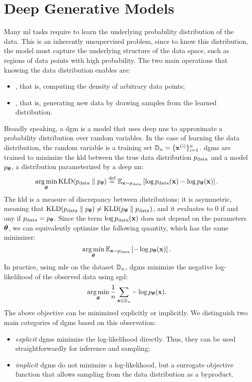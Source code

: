 \section{Deep Generative Models}
Many \gls{ml} tasks require to learn the underlying probability distribution of the data. This is an inherently unsupervised problem, since to know this distribution, the model must capture the underlying structure of the data space, such as regions of data points with high probability. The two main operations that knowing the data distribution enables are:
\begin{itemize}
    \item {}, that is, computing the density of arbitrary data points;
    \item {}, that is, generating new data by drawing samples from the learned distribution.
\end{itemize}
Broadly speaking, a \gls{dgm} \citep{goodfellow2016dl} is a model that uses deep \glspl{nn} to approximate a probability distribution over random variables. In the case of learning the data distribution, the random variable is a training set $\Data_n = \Set{\VPattern{x}{i}}_{i=1}^n$. \glspl{dgm} are trained to minimize the \gls{kld} between the true data distribution $p_{\mathrm{data}}$ and a model $p_{\boldsymbol{\theta}}$, a distribution parameterized by a deep \gls{nn}:
$$\argmin_{\Param} \Fun{KLD}(\PData \;\Vert\; p_{\Param}) \defeq \Expect_{\Vector{x} \sim \PData}\Brack{\log \PData(\Vector{x}) -\log p_{\Param}(\Vector{x})}.$$
The \gls{kld} is a measure of discrepancy between distributions; it is asymmetric, meaning that $\mathrm{KLD}(p_{\mathrm{data}} \;\Vert\; p_{\boldsymbol{\theta}}) \neq \mathrm{KLD}(p_{\boldsymbol{\theta}} \;\Vert\; p_{\mathrm{data}})$, and it evaluates to 0 if and ony if $p_{\mathrm{data}} = p_{\boldsymbol{\theta}}$. Since the term $\log \PData(\Vector{x})$ does not depend on the parameters $\boldsymbol{\theta}$, we can equivalently optimize the following quantity, which has the same minimizer:
$$\argmin_{\Param} \Expect_{\Vector{x} \sim \PData}\Brack{-\log p_{\Param}(\Vector{x})}.$$
In practice, using \gls{mle} on the dataset $\mathbb{D}_n$, \glspl{dgm} minimize the negative log-likelihood of the observed data using \gls{sgd}:
$$\argmin_{\Param} \frac{1}{n} \sum_{\Vector{x} \in \Data_n}-\log p_{\Param}(\Vector{x}).$$
The above objective can be minimized explicitly or implicitly. We distinguish two main categories of \glspl{dgm} based on this observation:
\begin{itemize}
    \item \emph{explicit} \glspl{dgm} minimize the log-likelihood directly. Thus, they can be used straightforwardly for inference and sampling;
    \item \emph{implicit} \glspl{dgm} do not minimize a log-likelihood, but a surrogate objective function that allows sampling from the data distribution as a byproduct.
\end{itemize}
